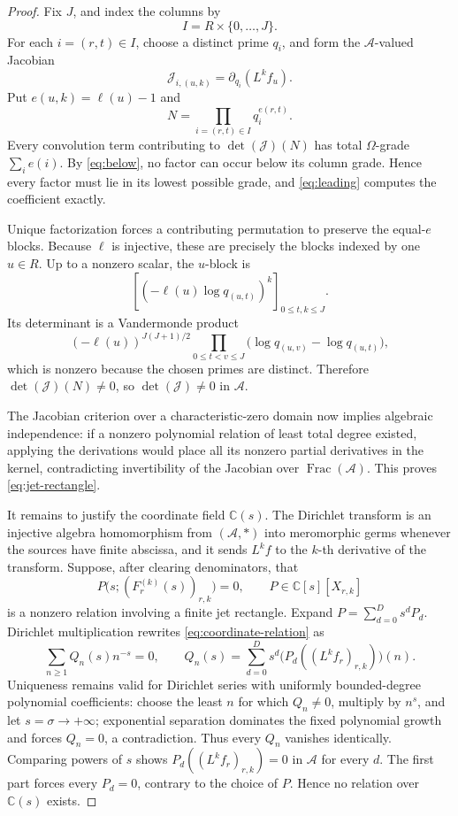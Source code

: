 \documentclass[11pt]{article}
\theoremstyle{definition}
\theoremstyle{remark}
\newcommand{\C}{\mathbb C}
\newcommand{\cA}{\mathcal A}
\newcommand{\Frac}{\operatorname{Frac}}
\begin{document}
\begin{proof}
Fix \(J\), and index the columns by
\[
 I=R\times\{0,\ldots,J\}.
\]
For each \(i=(r,t)\in I\), choose a distinct prime \(q_i\), and form the
\(\cA\)-valued Jacobian
\[
 \mathcal J_{i,(u,k)}
 =\partial_{q_i}(L^kf_u).
\]
Put \(e(u,k)=\ell(u)-1\) and
\[
 N=\prod_{i=(r,t)\in I}q_i^{e(r,t)}.
\]
Every convolution term contributing to \(\det(\mathcal J)(N)\) has total \(\Omega\)-grade
\(\sum_i e(i)\).  By \eqref{eq:below}, no factor can occur below its column grade.  Hence every
factor must lie in its lowest possible grade, and \eqref{eq:leading} computes the coefficient
exactly.

Unique factorization forces a contributing permutation to preserve the equal-\(e\) blocks.
Because \(\ell\) is injective, these are precisely the blocks indexed by one \(u\in R\).
Up to a nonzero scalar, the \(u\)-block is
\[
 \left[(-\ell(u)\log q_{(u,t)})^k\right]_
 {0\leq t,k\leq J}.
\]
Its determinant is a Vandermonde product
\[
 (-\ell(u))^{J(J+1)/2}
 \prod_{0\leq t<v\leq J}
 \bigl(\log q_{(u,v)}-\log q_{(u,t)}\bigr),
\]
which is nonzero because the chosen primes are distinct.  Therefore
\(\det(\mathcal J)(N)\ne0\), so \(\det(\mathcal J)\ne0\) in \(\cA\).

The Jacobian criterion over a characteristic-zero domain now implies algebraic independence:
if a nonzero polynomial relation of least total degree existed, applying the derivations would
place all its nonzero partial derivatives in the kernel, contradicting invertibility of the
Jacobian over \(\Frac(\cA)\).  This proves \eqref{eq:jet-rectangle}.

It remains to justify the coordinate field \(\C(s)\).  The Dirichlet transform is an injective
algebra homomorphism from \((\cA,*)\) into meromorphic germs whenever the sources have finite
abscissa, and it sends \(L^kf\) to the \(k\)-th derivative of the transform.  Suppose, after
clearing denominators, that
\[
 P\bigl(s;(F_r^{(k)}(s))_{r,k}\bigr)=0,
 \qquad P\in\C[s][X_{r,k}]
 \label{eq:coordinate-relation}
 \tag{4.7}
\]
is a nonzero relation involving a finite jet rectangle.  Expand
\(P=\sum_{d=0}^Ds^dP_d\).  Dirichlet multiplication rewrites \eqref{eq:coordinate-relation} as
\[
 \sum_{n\geq1}Q_n(s)n^{-s}=0,
 \qquad
 Q_n(s)=\sum_{d=0}^Ds^d
 \bigl(P_d((L^kf_r)_{r,k})\bigr)(n).
 \tag{4.8}
\]
Uniqueness remains valid for Dirichlet series with uniformly bounded-degree polynomial
coefficients: choose the least \(n\) for which \(Q_n\ne0\), multiply by \(n^s\), and let
\(s=\sigma\to+\infty\); exponential separation dominates the fixed polynomial growth and forces
\(Q_n=0\), a contradiction.  Thus every \(Q_n\) vanishes identically.  Comparing powers of \(s\)
shows \(P_d((L^kf_r)_{r,k})=0\) in \(\cA\) for every \(d\).  The first part forces every
\(P_d=0\), contrary to the choice of \(P\).  Hence no relation over \(\C(s)\) exists.
\end{proof}
\end{document}
